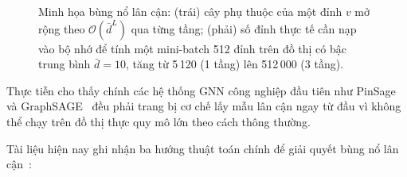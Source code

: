 \begin{figure}[htbp]
{}%
\caption{Minh họa bùng nổ lân cận: (trái) cây phụ thuộc của một đỉnh $v$ mở rộng theo $\mathcal{O}(\bar{d}^L)$ qua từng tầng; (phải) số đỉnh thực tế cần nạp vào bộ nhớ để tính một mini-batch 512 đỉnh trên đồ thị có bậc trung bình $\bar{d}=10$, tăng từ 5\,120 (1 tầng) lên 512\,000 (3 tầng).}
\label{fig:neighbor-explosion-preview}
\end{figure}

Thực tiễn cho thấy chính các hệ thống GNN công nghiệp đầu tiên như PinSage~\cite{Ying2018PinSage} và GraphSAGE~\cite{Hamilton2017} đều phải trang bị cơ chế lấy mẫu lân cận ngay từ đầu vì không thể chạy trên đồ thị thực quy mô lớn theo cách thông thường.

Tài liệu hiện nay ghi nhận ba hướng thuật toán chính để giải quyết bùng nổ lân cận~\cite{Duan2022LargeScaleBenchmark, Liu2021ScalableSampling}:

